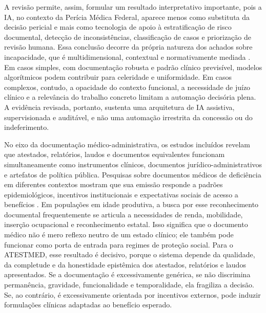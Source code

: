 \documentclass[12pt,a4paper]{article}
\begin{document}
A revisão permite, assim, formular um resultado interpretativo importante, pois a IA, no contexto da Perícia Médica Federal, aparece menos como substituta da decisão pericial e mais como tecnologia de apoio à estratificação de risco documental, detecção de inconsistências, classificação de casos e priorização de revisão humana. Essa conclusão decorre da própria natureza dos achados sobre incapacidade, que é multidimensional, contextual e normativamente mediada \parencite{dijkstrasdatamakingupincapacityforwork}. Em casos simples, com documentação robusta e padrão clínico previsível, modelos algorítmicos podem contribuir para celeridade e uniformidade. Em casos complexos, contudo, a opacidade do contexto funcional, a necessidade de juízo clínico e a relevância do trabalho concreto limitam a automação decisória plena. A evidência revisada, portanto, sustenta uma arquitetura de IA assistiva, supervisionada e auditável, e não uma automação irrestrita da concessão ou do indeferimento.

No eixo da documentação médico-administrativa, os estudos incluídos revelam que atestados, relatórios, laudos e documentos equivalentes funcionam simultaneamente como instrumentos clínicos, documentos jurídico-administrativos e artefatos de política pública. Pesquisas sobre documentos médicos de deficiência em diferentes contextos mostram que sua emissão responde a padrões epidemiológicos, incentivos institucionais e expectativas sociais de acesso a benefícios \parencite{sa2020medicalcertificateofdisabilityadescriptiveanalysisofav, hospital2016mentaldisabilityaretrospectivestudyofsocioclinica, rajasulochana2026doeshavingadisabilitycertificateensurebenefit}. Em populações em idade produtiva, a busca por esse reconhecimento documental frequentemente se articula a necessidades de renda, mobilidade, inserção ocupacional e reconhecimento estatal. Isso significa que o documento médico não é mero reflexo neutro de um estado clínico; ele também pode funcionar como porta de entrada para regimes de proteção social. Para o ATESTMED, esse resultado é decisivo, porque o sistema depende da qualidade, da completude e da honestidade epistêmica dos atestados, relatórios e laudos apresentados. Se a documentação é excessivamente genérica, se não discrimina permanência, gravidade, funcionalidade e temporalidade, ela fragiliza a decisão. Se, ao contrário, é excessivamente orientada por incentivos externos, pode induzir formulações clínicas adaptadas ao benefício esperado.
\end{document}
